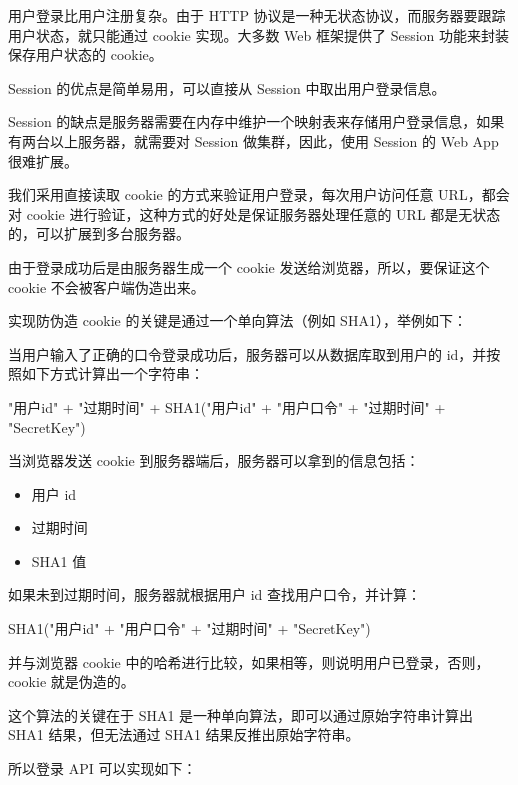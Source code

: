 用户登录比用户注册复杂。由于 HTTP
协议是一种无状态协议，而服务器要跟踪用户状态，就只能通过 cookie
实现。大多数 Web 框架提供了 Session 功能来封装保存用户状态的 cookie。

Session 的优点是简单易用，可以直接从 Session 中取出用户登录信息。

Session
的缺点是服务器需要在内存中维护一个映射表来存储用户登录信息，如果有两台以上服务器，就需要对
Session 做集群，因此，使用 Session 的 Web App 很难扩展。

我们采用直接读取 cookie 的方式来验证用户登录，每次用户访问任意
URL，都会对 cookie 进行验证，这种方式的好处是保证服务器处理任意的 URL
都是无状态的，可以扩展到多台服务器。

由于登录成功后是由服务器生成一个 cookie 发送给浏览器，所以，要保证这个
cookie 不会被客户端伪造出来。

实现防伪造 cookie 的关键是通过一个单向算法（例如 SHA1），举例如下：

当用户输入了正确的口令登录成功后，服务器可以从数据库取到用户的
id，并按照如下方式计算出一个字符串：

\begin{pythoncode}
"用户id" + "过期时间" + SHA1("用户id" + "用户口令" + "过期时间" + "SecretKey")
\end{pythoncode}

当浏览器发送 cookie 到服务器端后，服务器可以拿到的信息包括：

\begin{itemize}
\item
  用户 id
\item
  过期时间
\item
  SHA1 值
\end{itemize}

如果未到过期时间，服务器就根据用户 id 查找用户口令，并计算：

\begin{pythoncode}
SHA1("用户id" + "用户口令" + "过期时间" + "SecretKey")
\end{pythoncode}

并与浏览器 cookie
中的哈希进行比较，如果相等，则说明用户已登录，否则，cookie 就是伪造的。

这个算法的关键在于 SHA1 是一种单向算法，即可以通过原始字符串计算出 SHA1
结果，但无法通过 SHA1 结果反推出原始字符串。

所以登录 API 可以实现如下：

